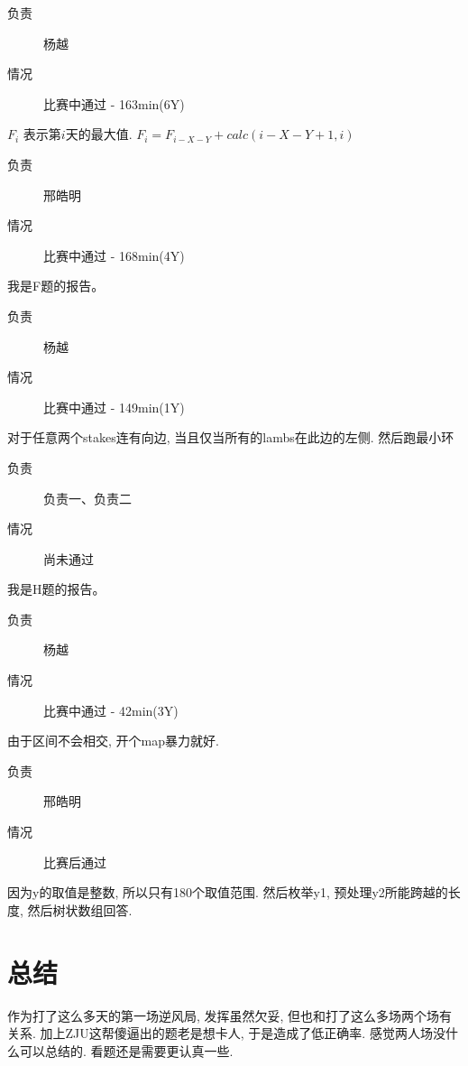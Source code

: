 
\begin{description}
\item[负责] 杨越
\item[情况] 比赛中通过 - 163min(6Y)
\end{description}

$F_i$ 表示第$i$天的最大值. $F_i = F_{i-X-Y} + calc(i-X-Y+1, i)$ 


\begin{description}
\item[负责] 邢皓明
\item[情况] 比赛中通过 - 168min(4Y)
\end{description}

我是F题的报告。


\begin{description}
\item[负责] 杨越
\item[情况] 比赛中通过 - 149min(1Y)
\end{description}

对于任意两个stakes连有向边, 当且仅当所有的lambs在此边的左侧. 然后跑最小环


\begin{description}
\item[负责] 负责一、负责二
\item[情况] 尚未通过
\end{description}

我是H题的报告。


\begin{description}
\item[负责] 杨越
\item[情况] 比赛中通过 - 42min(3Y)
\end{description}

由于区间不会相交, 开个map暴力就好.


\begin{description}
\item[负责] 邢皓明
\item[情况] 比赛后通过
\end{description}

因为y的取值是整数, 所以只有180个取值范围. 然后枚举y1, 预处理y2所能跨越的长度, 然后树状数组回答.

\section{总结}

作为打了这么多天的第一场逆风局, 发挥虽然欠妥, 但也和打了这么多场两个场有关系. 加上ZJU这帮傻逼出的题老是想卡人, 于是造成了低正确率. 感觉两人场没什么可以总结的. 看题还是需要更认真一些.



